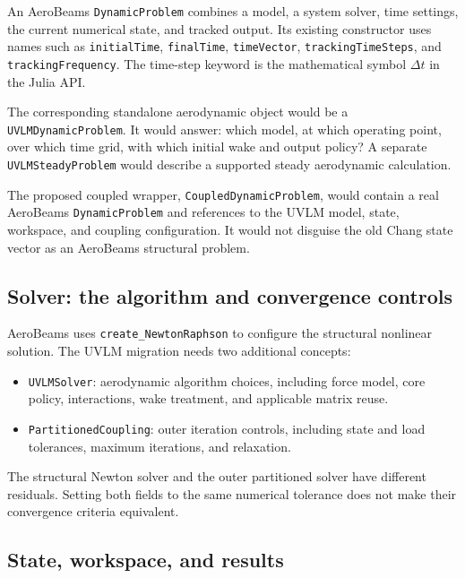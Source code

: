\documentclass[11pt,a4paper]{article}
\newcommand{\code}{\nolinkurl}
\begin{document}
An AeroBeams \code{DynamicProblem} combines a model, a system solver, time
settings, the current numerical state, and tracked output. Its existing
constructor uses names such as \code{initialTime}, \code{finalTime},
\code{timeVector}, \code{trackingTimeSteps}, and \code{trackingFrequency}.
The time-step keyword is the mathematical symbol $\Delta t$ in the Julia API.

The corresponding standalone aerodynamic object would be a
\code{UVLMDynamicProblem}. It would answer: which model, at which operating
point, over which time grid, with which initial wake and output policy?
A separate \code{UVLMSteadyProblem} would describe a supported steady
aerodynamic calculation.

The proposed coupled wrapper, \code{CoupledDynamicProblem}, would contain a
real AeroBeams \code{DynamicProblem} and references to the UVLM model, state,
workspace, and coupling configuration. It would not disguise the old Chang
state vector as an AeroBeams structural problem.

\subsection{Solver: the algorithm and convergence controls}

AeroBeams uses \code{create_NewtonRaphson} to configure the structural nonlinear
solution. The UVLM migration needs two additional concepts:

\begin{itemize}
\item \code{UVLMSolver}: aerodynamic algorithm choices, including force model,
core policy, interactions, wake treatment, and applicable matrix reuse.
\item \code{PartitionedCoupling}: outer iteration controls, including state
and load tolerances, maximum iterations, and relaxation.
\end{itemize}

The structural Newton solver and the outer partitioned solver have different
residuals. Setting both fields to the same numerical tolerance does not make
their convergence criteria equivalent.

\subsection{State, workspace, and results}
\end{document}
